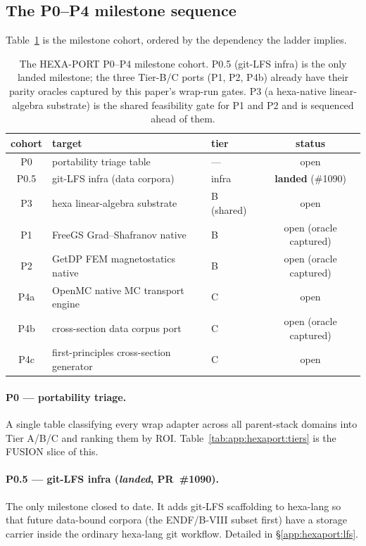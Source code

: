 \subsection{The P0--P4 milestone sequence}
\label{app:hexaport:milestones}

Table~\ref{tab:app:hexaport:cohorts} is the milestone cohort, ordered by
the dependency the ladder implies.

\begin{table}[h]
\centering
\small
\begin{tabular}{cllc}
\toprule
cohort & target & tier & status \\
\midrule
P0   & portability triage table & --- & open \\
P0.5 & git-LFS infra (data corpora) & infra & \textbf{landed} (\#1090) \\
P3   & hexa linear-algebra substrate & B (shared) & open \\
P1   & FreeGS Grad--Shafranov native & B & open (oracle captured) \\
P2   & GetDP FEM magnetostatics native & B & open (oracle captured) \\
P4a  & OpenMC native MC transport engine & C & open \\
P4b  & cross-section data corpus port & C & open (oracle captured) \\
P4c  & first-principles cross-section generator & C & open \\
\bottomrule
\end{tabular}
\caption{The HEXA-PORT P0--P4 milestone cohort. P0.5 (git-LFS infra)
is the only landed milestone; the three Tier-B/C ports (P1, P2, P4b)
already have their parity oracles captured by this paper's wrap-run
gates. P3 (a hexa-native linear-algebra substrate) is the shared
feasibility gate for P1 and P2 and is sequenced ahead of them.}
\label{tab:app:hexaport:cohorts}
\end{table}

\paragraph{P0 --- portability triage.} A single table classifying
every wrap adapter across all parent-stack domains into Tier A/B/C and
ranking them by ROI. Table~\ref{tab:app:hexaport:tiers} is the FUSION
slice of this.

\paragraph{P0.5 --- git-LFS infra (\emph{landed}, PR~\#1090).} The only
milestone closed to date. It adds git-LFS scaffolding to hexa-lang so
that future data-bound corpora (the ENDF/B-VIII subset first) have a
storage carrier inside the ordinary hexa-lang git workflow. Detailed
in \S\ref{app:hexaport:lfs}.

